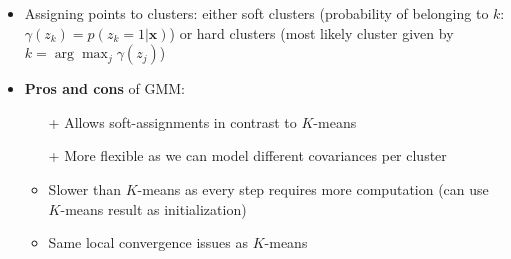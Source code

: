 \begin{itemize}
\begin{itemize}
	\end{itemize}
	\item Assigning points to clusters: either soft clusters (probability of belonging to $k$: $\gamma\left(z_{k}\right) = p\left(z_k=1|\bm{x}\right)$) or hard clusters (most likely cluster given by $k=\arg\max_j \gamma\left(z_j\right)$)
	\item \textbf{Pros and cons} of GMM:
	\begin{itemize}
		\item[+] Allows soft-assignments in contrast to $K$-means
		\item[+] More flexible as we can model different covariances per cluster
		\item Slower than $K$-means as every step requires more computation (can use $K$-means result as initialization)
		\item Same local convergence issues as $K$-means
	\end{itemize}
\end{itemize}
